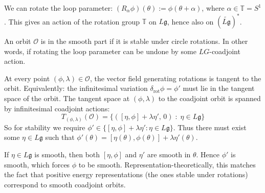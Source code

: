 \documentclass[12pt]{article}
\begin{document}
\begin{remark}
    We can rotate the loop parameter: $(R_\alpha\phi)(\theta) := \phi(\theta+\alpha)$, where $\alpha\in\mathbb T=S^1$. This gives an action of the rotation group $\mathbb T$ on $L\mathfrak g$, hence also on $(\widetilde{L\mathfrak g})^*$.

An orbit $\mathcal O$ is in the smooth part if it is stable under circle rotations. In other words, if rotating the loop parameter can be undone by some $LG$-coadjoint action.

At every point $(\phi,\lambda)\in\mathcal O$, the vector field generating rotations is tangent to the orbit. Equivalently: the infinitesimal variation $\delta_{\mathrm{rot}}\phi = \phi'$ must lie in the tangent space of the orbit. The tangent space at $(\phi,\lambda)$ to the coadjoint orbit is spanned by infinitesimal coadjoint actions: \[T_{(\phi,\lambda)}(\mathcal O) = \{([\eta,\phi] + \lambda \eta',\,0)\;:\; \eta \in L\mathfrak g\}\]
So for stability we require $\phi' \in \{[\eta,\phi] + \lambda \eta' : \eta\in L\mathfrak g\}$. Thus there must exist some $\eta \in L\mathfrak g$ such that $\phi'(\theta) = [\eta(\theta),\phi(\theta)] + \lambda \eta'(\theta)$.

If $\eta \in L\mathfrak g$ is smooth, then both $[\eta,\phi]$ and $\eta'$ are smooth in $\theta$. Hence $\phi'$ is smooth, which forces $\phi$ to be smooth. Representation-theoretically, this matches the fact that positive energy representations (the ones stable under rotations) correspond to smooth coadjoint orbits.
\end{remark}
\end{document}
